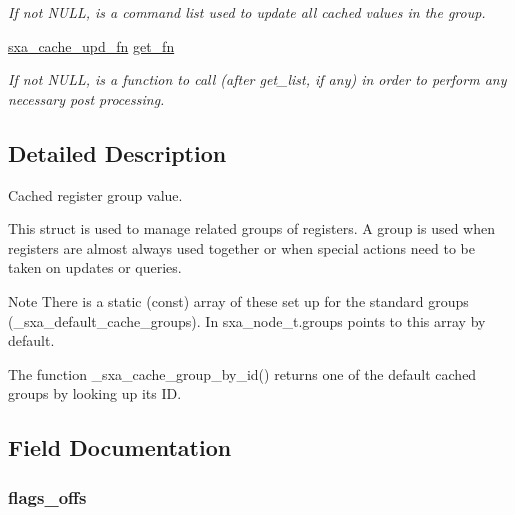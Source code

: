 \begin{DoxyCompactItemize}
\begin{DoxyCompactList}\small\item\em If not N\-U\-L\-L, is a command list used to update all cached values in the group. \end{DoxyCompactList}\item 
\hyperlink{group___s_x_a_ga33ed33d7f2ab515af37029d8b4b4f449}{sxa\-\_\-cache\-\_\-upd\-\_\-fn} \hyperlink{structsxa__cached__group__t_aa73aae7aa31e051678e55ca4025a2d3a}{get\-\_\-fn}
\begin{DoxyCompactList}\small\item\em If not N\-U\-L\-L, is a function to call (after get\-\_\-list, if any) in order to perform any necessary post processing. \end{DoxyCompactList}\end{DoxyCompactItemize}


\subsection{Detailed Description}
Cached register group value. 

This struct is used to manage related groups of registers. A group is used when registers are almost always used together or when special actions need to be taken on updates or queries.

\begin{DoxyNote}{Note}
There is a static (const) array of these set up for the standard groups (\-\_\-sxa\-\_\-default\-\_\-cache\-\_\-groups). In sxa\-\_\-node\-\_\-t.\-groups points to this array by default.
\end{DoxyNote}
The function \-\_\-sxa\-\_\-cache\-\_\-group\-\_\-by\-\_\-id() returns one of the default cached groups by looking up its I\-D. 

\subsection{Field Documentation}
\hypertarget{structsxa__cached__group__t_a384f3d44ddc76275447a4027f7d7dc11}{
\subsubsection[{flags\-\_\-offs}]{ flags\-\_\-offs}}\label{structsxa__cached__group__t_a384f3d44ddc76275447a4027f7d7dc11}


